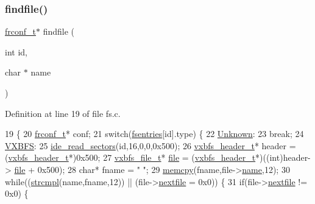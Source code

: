 \subsubsection{\texorpdfstring{findfile()}{findfile()}}
{\footnotesize\ttfamily \hyperlink{a00191_a752f1bef3c13b98d682fddc44a9e47c8_a752f1bef3c13b98d682fddc44a9e47c8}{frconf\+\_\+t}$\ast$ findfile (\begin{DoxyParamCaption}\item[{int}]{id,  }\item[{char $\ast$}]{name }\end{DoxyParamCaption})}



Definition at line 19 of file fs.\+c.


\begin{DoxyCode}
19                                        \{
20     \hyperlink{a00324}{frconf\_t}* conf;
21     \textcolor{keywordflow}{switch}(\hyperlink{a00152_a6b46131164b26e476762930c9aae4319_a6b46131164b26e476762930c9aae4319}{fsentries}[\textcolor{keywordtype}{id}].type) \{
22         \hyperlink{a00161_a2e9d0c3765a28910638672bfc746181b_a2e9d0c3765a28910638672bfc746181ba4e81c184ac3ad48a389cd4454c4a05bb}{Unknown}:
23             \textcolor{keywordflow}{break};
24         \hyperlink{a00161_a2e9d0c3765a28910638672bfc746181b_a2e9d0c3765a28910638672bfc746181bac740d3121d634c0d77f5602b1fdab236}{VXBFS}:
25             \hyperlink{a00032_a9dd84843412753d236e17a15277c5b98_a9dd84843412753d236e17a15277c5b98}{ide\_read\_sectors}(\textcolor{keywordtype}{id},16,0,0,0x500);
26             \hyperlink{a00344}{vxbfs\_header\_t}* header = (\hyperlink{a00344}{vxbfs\_header\_t}*)0x500;
27             \hyperlink{a00340}{vxbfs\_file\_t}* \hyperlink{a00308}{file} = (\hyperlink{a00344}{vxbfs\_header\_t}*)((\textcolor{keywordtype}{int})header->
      \hyperlink{a00344_a3b903de5c5034494530cdc0c2d4ff9b1_a3b903de5c5034494530cdc0c2d4ff9b1}{file} + 0x500);
28             \textcolor{keywordtype}{char}* fname = \textcolor{stringliteral}{"           "};
29             \hyperlink{a00131_a370712322c794e949c996946f2283ea8_a370712322c794e949c996946f2283ea8}{memcpy}(fname,file->\hyperlink{a00340_a07ecc9bacdc2943442f26f62f6749055_a07ecc9bacdc2943442f26f62f6749055}{name},12);
30             \textcolor{keywordflow}{while}((\hyperlink{a00125_a3c8c44ba2ae232bc5ae8449de1448164_a3c8c44ba2ae232bc5ae8449de1448164}{strcmpl}(name,fname,12)) || (file->\hyperlink{a00340_aa2c7e2e1b3827ce9fbaa045b89202784_aa2c7e2e1b3827ce9fbaa045b89202784}{nextfile} = 0x0)) \{
31                 \textcolor{keywordflow}{if}(file->\hyperlink{a00340_aa2c7e2e1b3827ce9fbaa045b89202784_aa2c7e2e1b3827ce9fbaa045b89202784}{nextfile} != 0x0) \{

\end{DoxyCode}
